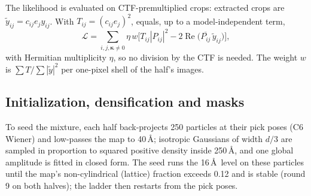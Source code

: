 The likelihood is evaluated on CTF-premultiplied crops: extracted crops are $\tilde{y}_{ij}=c_{ij}e_jy_{ij}$.
With $T_{ij}=(c_{ij}e_j)^2$,  equals, up to a model-independent term,
\begin{equation}
\mathcal{L}=\sum_{i,j,\bm{\kappa}\neq0}\eta\,w\Big[T_{ij}|P_{ij}|^2-2\operatorname{Re}\big(\overline{P_{ij}}\,\tilde{y}_{ij}\big)\Big],
\label{eq:likepm}
\end{equation}
with Hermitian multiplicity $\eta$, so no division by the CTF is needed.
The weight $w$ is $\sum T/\sum|\tilde{y}|^2$ per one-pixel shell of the half's images.

\subsection{Initialization, densification and masks}
\label{sec:suppl:method:init}

To seed the mixture, each half back-projects 250 particles at their pick poses (C6 Wiener) and low-passes the map to 40\,\AA; isotropic Gaussians of width $d/3$ are sampled in proportion to squared positive density inside 250\,\AA, and one global amplitude is fitted in closed form.
The seed runs the 16\,\AA\ level on these particles until the map's non-cylindrical (lattice) fraction exceeds 0.12 and is stable (round 9 on both halves); the ladder then restarts from the pick poses.

